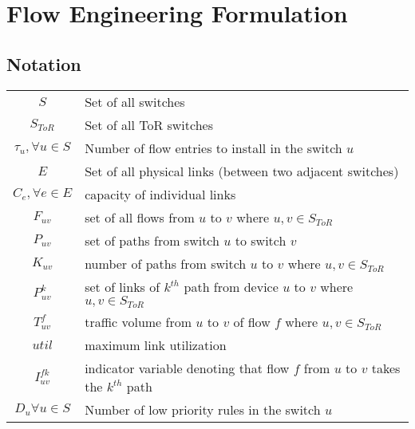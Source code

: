 

\section{Flow Engineering Formulation}

\subsection{Notation}

\begin{table*}[!t]
\centering
\small
\begin{tabular}{c|l}
\hline
$S$ & Set of all switches \\
$S_{ToR}$ & Set of all ToR switches \\
$\tau_{u}, \forall u \in S$ & Number of flow entries to install in the switch $u$ \\
$E$ & Set of all physical links (between two adjacent switches) \\
$C_e, \forall e \in E$ & capacity of individual links \\
$F_{uv}$ & set of all flows from $u$ to $v$ where $u,v \in S_{ToR}$ \\
$P_{uv}$ & set of paths from switch $u$ to switch $v$ \\
$K _{uv}$ & number of paths from switch $u$ to $v$ where $u,v \in S_{ToR}$ \\
$P^k _{uv}$ & set of links of $k^{th}$ path from device $u$ to $v$ where $u,v \in S_{ToR}$ \\
$T ^f _{uv}$ & traffic volume from $u$ to $v$ of flow $f$ where $u,v \in S_{ToR}$ \\
$util$ & maximum link utilization \\
$I ^{fk} _{uv}$ & indicator variable denoting that flow $f$ from $u$ to $v$  takes the $k^{th}$ path \\
$D_{u} \forall u \in S$ & Number of low priority rules in the switch $u$ \\
\hline
\end{tabular}
\end{table*}

